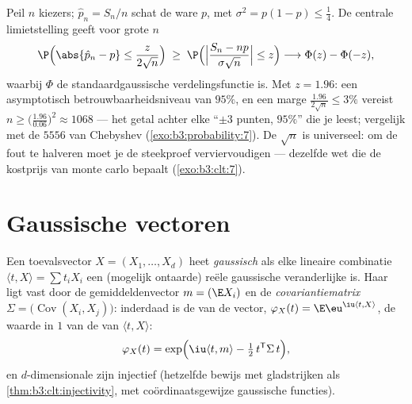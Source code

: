 \begin{example}
\label{ex:b3:clt:confidence}
Peil $n$  kiezers; $\hat p_n = S_n/n$ schat de ware
$p$, met $\sigma^2 = p(1-p) \leq \frac14$. De centrale
limietstelling geeft voor grote $n$
\[
\P\Bigl(\abs{\hat p_n - p} \leq
\frac{z}{2\sqrt n}\Bigr)
\;\geq\; \P\Bigl(\Bigl|\frac{S_n - np}{\sigma\sqrt n}\Bigr|
\leq z\Bigr)
\longrightarrow \Phi(z) - \Phi(-z),
\]
waarbij $\Phi$ de standaardgaussische verdelingsfunctie is. Met
$z = 1.96$: een asymptotisch betrouwbaarheidsniveau van $95\%$,
en een marge $\frac{1.96}{2\sqrt n} \leq 3\%$ vereist $n \geq
\bigl(\frac{1.96}{0.06}\bigr)^2 \approx 1068$ --- het getal
achter elke ``$\pm3$ punten, $95\%$'' die je leest; vergelijk met
de $5556$ van Chebyshev (\cref{exo:b3:probability:7}). De $\sqrt
n$ is universeel: om de fout te halveren moet je de steekproef
verviervoudigen --- dezelfde wet die de kostprijs van monte carlo
bepaalt (\cref{exo:b3:clt:7}).
\end{example}

\section{Gaussische vectoren}

\begin{definition}\label{def:b3:clt:gaussianvector}
Een toevalsvector $X = (X_1, \dots, X_d)$ heet
\emph{gaussisch} als elke lineaire
combinatie $\langle t, X\rangle = \sum t_iX_i$ een (mogelijk
ontaarde) reële gaussische veranderlijke is. Haar  ligt
vast door de gemiddeldenvector $m = (\E X_i)$ en de
\emph{covariantiematrix} $\Sigma = \bigl(\operatorname{Cov} (X_i,
X_j)\bigr)$: inderdaad is de  van de
vector, $\varphi_X(t) = \E\eu^{\iu\langle t, X\rangle}$, de
waarde in $1$ van de  van $\langle t,
X\rangle$:
\[
\varphi_X(t) = \exp\Bigl(\iu\langle t, m\rangle -
\tfrac12\,t^{\mathsf T}\Sigma\,t\Bigr),
\]
en $d$-dimensionale  zijn injectief
(hetzelfde bewijs met gladstrijken als
\cref{thm:b3:clt:injectivity}, met coördinaatsgewijze gaussische
functies).
\end{definition}


